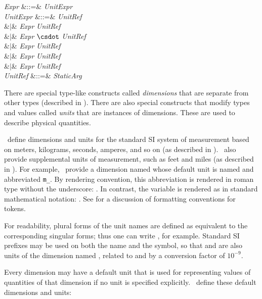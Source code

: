 \begin{GrammarTwo}
\emph{Expr} &::=& \emph{UnitExpr}\\

\emph{UnitExpr} &::=& \emph{UnitRef}\\
&$|$& \emph{Expr} \emph{UnitRef}\\
&$|$& \emph{Expr} $\csdot$ \emph{UnitRef}\\
&$|$& \emph{Expr} \EXP{/} \emph{UnitRef}\\
&$|$& \emph{Expr}  \emph{UnitRef}\\
&$|$& \emph{Expr}  \emph{UnitRef}\\

\emph{UnitRef} &::=& \emph{StaticArg} \\

\end{GrammarTwo}

There are special type-like constructs called \emph{dimensions} that are
separate from other types (described in ).
There are also special constructs that modify types and values called
\emph{units} that are instances of dimensions.
These are used to describe physical quantities.

\Library\ define dimensions and units for the standard SI system of measurement
based on meters, kilograms, seconds, amperes, and so on (as described in
).   \Library\ also provide
supplemental units of measurement, such as feet and miles (as described in
).  For example,
\library\ provide a dimension named  whose default unit is named
 and abbreviated \verb$m_$.
By rendering convention, this abbreviation is rendered in roman type
without the underscore: . In contrast, the variable  is rendered as in standard
mathematical notation: .
See  for a discussion of formatting conventions for tokens.

For readability, plural forms of the unit names are defined as equivalent to the
corresponding singular forms; thus one can write ,
for example.
Standard SI prefixes may be used on both the name and the symbol, so that 
and  are also units of the dimension named , related to 
and  by a conversion factor of $10^{-9}$.

Every dimension may have a default unit that is used for representing
values of quantities of that dimension if no unit is specified explicitly.
\Library\ define these default dimensions and units:

